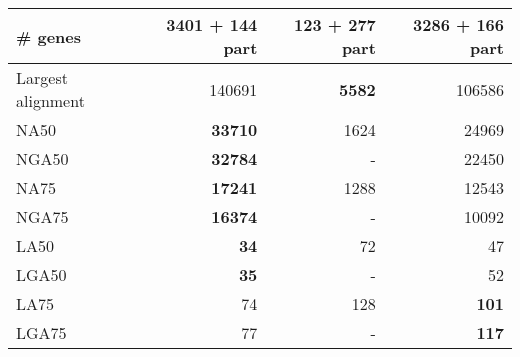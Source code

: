 \documentclass[12pt,a4paper]{article}
\begin{document}
\begin{table}[ht]
\begin{center}
\begin{tabular}{|l*{3}{|r}|}
\# genes & {\bf 3401 + 144 part} & 123 + 277 part & 3286 + 166 part \\ \hline
Largest alignment & 140691 & {\bf 5582} & 106586 \\ \hline
NA50 & {\bf 33710} & 1624 & 24969 \\ \hline
NGA50 & {\bf 32784} & - & 22450 \\ \hline
NA75 & {\bf 17241} & 1288 & 12543 \\ \hline
NGA75 & {\bf 16374} & - & 10092 \\ \hline
LA50 & {\bf 34} & 72 & 47 \\ \hline
LGA50 & {\bf 35} & - & 52 \\ \hline
LA75 & 74 & 128 & {\bf 101} \\ \hline
LGA75 & 77 & - & {\bf 117} \\ \hline
\end{tabular}
\end{center}
\end{table}
\end{document}
